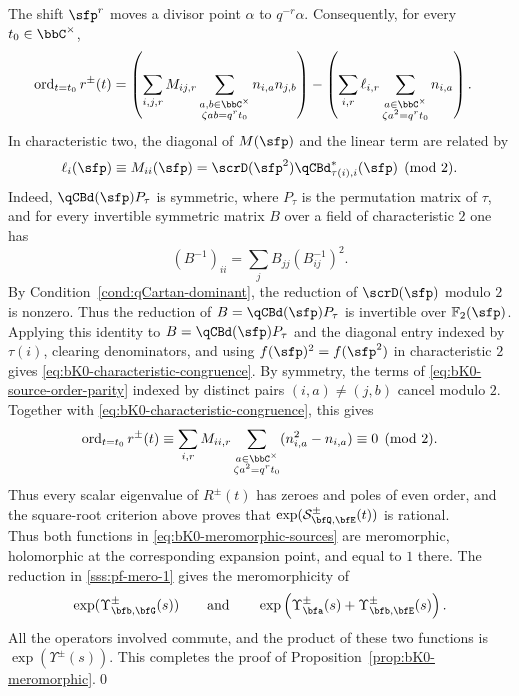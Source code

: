 \documentclass[reqno]{amsart}
\numberwithin{equation}{section}
\begin{document}
The shift $\sfp^r$ moves a divisor point $\alpha$ to $q^{-r}\alpha$.
Consequently, for every $t_0\in\bbC^\times$,
\begin{equation}\label{eq:bK0-source-order-parity}
	\begin{aligned}
		\operatorname{ord}_{t=t_0}r^\pm(t)
		&=\left(\sum_{i,j,r}M_{ij,r}
		\sum_{\substack{a,b\in\bbC^\times\\\zeta ab=q^rt_0}}
		n_{i,a}n_{j,b}\right)-\left(\sum_{i,r}\ell_{i,r}
		\sum_{\substack{a\in\bbC^\times\\\zeta a^2=q^rt_0}}n_{i,a}\right).
	\end{aligned}
\end{equation}
In characteristic two, the diagonal of $M(\sfp)$ and the linear term are related by
\begin{equation}\label{eq:bK0-characteristic-congruence}
\ell_i(\sfp)
\equiv
M_{ii}(\sfp)
=
\scrD(\sfp^2)\qCBd^*_{\tau(i),i}(\sfp)
\pmod 2.
\end{equation}
Indeed, $\qCBd(\sfp)P_\tau$ is symmetric, where $P_\tau$ is the
permutation matrix of $\tau$, and for every invertible symmetric matrix
$B$ over a field of characteristic $2$ one has
\[
(B^{-1})_{ii}
=
\sum_jB_{jj}(B^{-1}_{ij})^2.
\]
By Condition~\ref{cond:qCartan-dominant}, the reduction of
$\scrD(\sfp)$ modulo $2$ is nonzero. Thus the reduction of
$B=\qCBd(\sfp)P_\tau$ is invertible over $\mathbb F_2(\sfp)$.
Applying this identity to $B=\qCBd(\sfp)P_\tau$ and the diagonal entry
indexed by $\tau(i)$, clearing
denominators, and using $f(\sfp)^2=f(\sfp^2)$ in characteristic $2$
gives \eqref{eq:bK0-characteristic-congruence}.
By symmetry, the terms of \eqref{eq:bK0-source-order-parity}
indexed by distinct pairs $(i,a)\neq(j,b)$ cancel modulo $2$.
Together with \eqref{eq:bK0-characteristic-congruence}, this gives
\[
\operatorname{ord}_{t=t_0}r^\pm(t)
\equiv
\sum_{i,r}M_{ii,r}
\sum_{\substack{a\in\bbC^\times\\\zeta a^2=q^rt_0}}
(n_{i,a}^2-n_{i,a})
\equiv0\pmod2.
\]
Thus every scalar eigenvalue of $R^\pm(t)$ has zeroes and poles of even
order, and the square-root criterion above proves that
$\exp(\mathcal S_{\bfQ,\bfE}^\pm(t))$ is rational.\\

Thus both functions in \eqref{eq:bK0-meromorphic-sources} are
meromorphic, holomorphic at the corresponding expansion point, and
equal to $1$ there. The reduction in \ref{sss:pf-mero-1} gives the
meromorphicity of
\[
\exp(\Upsilon_{\bfb,\bfG}^\pm(s))
\qquad\text{and}\qquad
\exp\left(
\Upsilon_{\bfa}^\pm(s)+
\Upsilon_{\bfb,\bfE}^\pm(s)
\right).
\]
All the operators involved commute, and the product of these two
functions is $\exp(\Upsilon^\pm(s))$. This completes the proof of
Proposition~\ref{prop:bK0-meromorphic}.\hfill\qed
\end{document}
